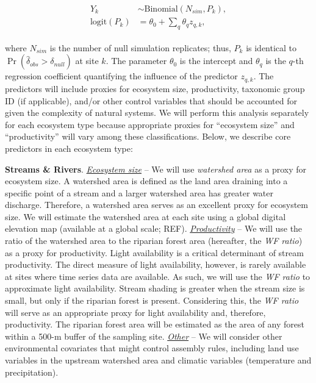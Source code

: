 \documentclass[12pt, class=article, crop=false]{standalone}
\begin{document}
\begin{align}
\begin{split}
    Y_k &\sim \mbox{Binomial}(N_{sim}, P_k),\\
    \mbox{logit}(P_k) &= \theta_0 + \sum_q \theta_q z_{q,k},
\end{split}
\end{align}

where $N_{sim}$ is the number of null simulation replicates; thus, $P_k$ is identical to $\Pr(\hat{\delta}_{obs} > \delta_{null})$ at site $k$.
The parameter $\theta_0$ is the intercept and $\theta_q$ is the $q$-th regression coefficient quantifying the influence of the predictor $z_{q,k}$.
The predictors will include proxies for ecosystem size, productivity, taxonomic group ID (if applicable), and/or other control variables that should be accounted for given the complexity of natural systems.
We will perform this analysis separately for each ecosystem type because appropriate proxies for ``ecosystem size'' and ``productivity'' will vary among these classifications.
Below, we describe core predictors in each ecosystem type:

\textbf{Streams \& Rivers}.
\ul{\textit{Ecosystem size}} --
We will use \textit{watershed area} as a proxy for ecosystem size.
A watershed area is defined as the land area draining into a specific point of a stream and a larger watershed area has greater water discharge.
Therefore, a watershed area serves as an excellent proxy for ecosystem size.
We will estimate the watershed area at each site using a global digital elevation map (available at a global scale; REF).
\ul{\textit{Productivity}} -- 
We will use the ratio of the watershed area to the riparian forest area (hereafter, the \textit{WF ratio}) as a proxy for productivity.
Light availability is a critical determinant of stream productivity.
The direct measure of light availability, however, is rarely available at sites where time series data are available.
As such, we will use the \textit{WF ratio} to approximate light availability.
Stream shading is greater when the stream size is small, but only if the riparian forest is present.
Considering this, the \textit{WF ratio} will serve as an appropriate proxy for light availability and, therefore, productivity.
The riparian forest area will be estimated as the area of any forest within a 500-m buffer of the sampling site.
\ul{\textit{Other}} -- We will consider other environmental covariates that might control assembly rules, including land use variables in the upstream watershed area and climatic variables (temperature and precipitation).
\end{document}
